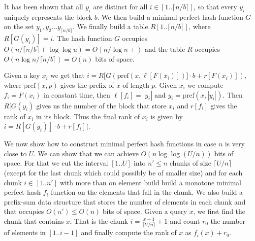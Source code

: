 \documentclass[a4paper]{article}
\begin{document}
It has been shown that all $y_i$ are distinct for all $i\in[1..\lceil n/b\rceil]$, so that every $y_i$ 
uniquely represents the block $b$. We then build a minimal perfect hash function $G$ on the set 
$y_1,y_2\ldots y_{\lceil n/b\rceil}$. We finally build a table $R[1..\lceil n/b\rceil]$, 
where $R[G(y_i)]=i$. The hash function $G$ occupies $O(n/\lceil n/b\rceil+\log\log u)=O(n/\log n+)$
and the table $R$ occupies $O(n\log n/\lceil n/b\rceil)=O(n)$ bits of space. 

Given a key $x_i$ we get that $i=R[G(\mathrm{pref}(x,\ell[F(x_i)])]\cdot b+r[F(x_i)])$, where $\mathrm{pref}(x,p)$
gives the prefix of $x$ of length $p$. Given $x_i$ we compute $f_i=F(x_i)$ in constant time, 
then $\ell[f_i]=|y_i|$ and $y_i=\mathrm{pref}(x,|y_i|)$. Then $R[G(y_i)$ gives us the number of the block 
that store $x_i$ and $r[f_i]$ gives the rank of $x_i$ in its block. Thus the final rank of $x_i$ 
is given by $i=R[G(y_i)]\cdot b+r[f_i])$.

We now show how to construct minimal perfect hash functions in case 
$n$ is very close to $U$. We can show that we can achieve $O(n\log\log (U/n))$ 
bits of space. For that we cut the interval $[1..U]$ into $n'\leq n$ chunks of size $\lceil U/n\rceil$
(except for the last chunk which could possibly be of smaller size) and for each chunk 
$i\in[1..n']$ with more than on element build build a monotone minimal perfect hash $f_i$ function on the
elements that fall in the chunk. We also build a prefix-sum data structure that stores the 
number of elements in each chunk and that occupies $O(n')\leq O(n)$ bits of space.
Given a query $x$, we first find the chunk that contains $x$. 
That is the chunk $i=\frac{x-1}{\lceil U/n\rceil}+1$ and count $r_0$ the number of elements in 
$[1..i-1]$ and finally compute the rank of $x$ as $f_i(x)+r_0$. 
\end{document}
